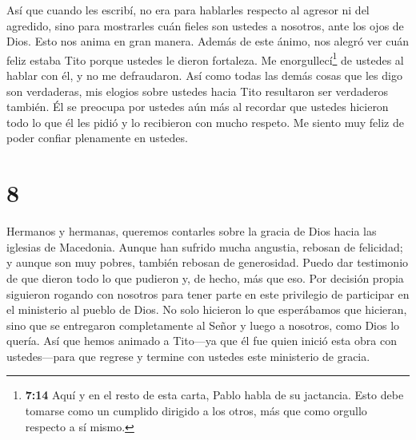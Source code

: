  Así que cuando les escribí, no era para hablarles respecto
al agresor ni del agredido, sino para mostrarles cuán fieles son ustedes
a nosotros, ante los ojos de Dios.  Esto nos anima en gran
manera. Además de este ánimo, nos alegró ver cuán feliz estaba Tito
porque ustedes le dieron fortaleza.  Me
enorgullecí\footnote{\textbf{7:14} Aquí y en el resto de esta carta,
  Pablo habla de su jactancia. Esto debe tomarse como un cumplido
  dirigido a los otros, más que como orgullo respecto a sí mismo.} de
ustedes al hablar con él, y no me defraudaron. Así como todas las demás
cosas que les digo son verdaderas, mis elogios sobre ustedes hacia Tito
resultaron ser verdaderos también.  Él se preocupa por
ustedes aún más al recordar que ustedes hicieron todo lo que él les
pidió y lo recibieron con mucho respeto.  Me siento muy
feliz de poder confiar plenamente en ustedes.

\hypertarget{section-7}{%
\section{8}\label{section-7}}

 Hermanos y hermanas, queremos contarles sobre la gracia de
Dios hacia las iglesias de Macedonia.  Aunque han sufrido
mucha angustia, rebosan de felicidad; y aunque son muy pobres, también
rebosan de generosidad.  Puedo dar testimonio de que dieron
todo lo que pudieron y, de hecho, más que eso. Por decisión propia
 siguieron rogando con nosotros para tener parte en este
privilegio de participar en el ministerio al pueblo de Dios.
 No solo hicieron lo que esperábamos que hicieran, sino que
se entregaron completamente al Señor y luego a nosotros, como Dios lo
quería.  Así que hemos animado a Tito---ya que él fue quien
inició esta obra con ustedes---para que regrese y termine con ustedes
este ministerio de gracia.

